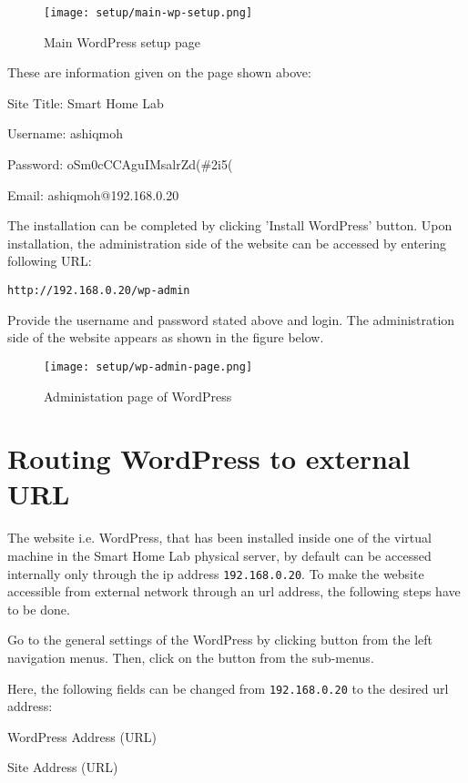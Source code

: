 \begin{figure}[ht]
\caption{Main WordPress setup page}
\centering
\texttt{[image: setup/main-wp-setup.png]}
\end{figure}

These are information given on the page shown above:
\begin{itemize*}
\item Site Title: Smart Home Lab
\item Username: ashiqmoh
\item Password: oSm0cCCAguIMsalrZd(\#2i5(
\item Email: ashiqmoh@192.168.0.20
\end{itemize*}

The installation can be completed by clicking 'Install WordPress' button. Upon installation, the administration side of the website can be accessed by entering following URL:
\begin{lstlisting}
http://192.168.0.20/wp-admin
\end{lstlisting}

Provide the username and password stated above and login. The administration side of the website appears as shown in the figure below.

\begin{figure}[ht]
\caption{Administation page of WordPress}
\centering
\texttt{[image: setup/wp-admin-page.png]}
\end{figure}

\section{Routing WordPress to external URL} \label{sec:routing-wordpress-to-external-url}
The website i.e. WordPress, that has been installed inside one of the virtual machine in the Smart Home Lab physical server, by default can be accessed internally only through the \ac{ip} address \texttt{192.168.0.20}. To make the website accessible from external network through an \ac{url} address, the following steps have to be done.

Go to the general settings of the WordPress by clicking  button from the left navigation menus. Then, click on the  button from the sub-menus.

Here, the following fields can be changed from \texttt{192.168.0.20} to the desired \ac{url} address:
\begin{itemize*}
\item WordPress Address (URL)
\item Site Address (URL)
\end{itemize*}

